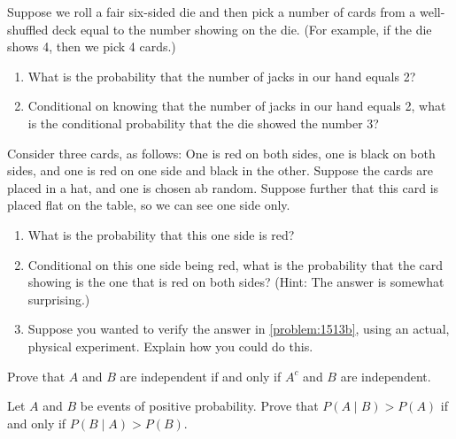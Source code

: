 \begin{exercises}
    \item Suppose we roll a fair six-sided die and then pick a number of cards from a well-shuffled deck equal to the number showing on the die. (For example, if the die shows 4, then we pick 4 cards.)
        \begin{enumerate}
            \item What is the probability that the number of jacks in our hand equals 2?
            \item Conditional on knowing that the number of jacks in our hand equals 2, what is the conditional probability that the die showed the number 3?
        \end{enumerate}
\end{exercises}

\begin{problems}
    \item Consider three cards, as follows: One is red on both sides, one is black on both sides, and one is red on one side and black in the other. Suppose the cards are placed in a hat, and one is chosen ab random. Suppose further that this card is placed flat on the table, so we can see one side only.
        \begin{enumerate}
            \item What is the probability that this one side is red?
            \item \label{problem:1513b}Conditional on this one side being red, what is the probability that the card showing is the one that is red on both sides? (Hint: The answer is somewhat surprising.)
            \item Suppose you wanted to verify the answer in  \autoref{problem:1513b}, using an actual, physical experiment. Explain how you could do this.
        \end{enumerate}
    \item Prove that $A$ and $B$ are independent if and only if $A^c$ and $B$ are independent.
    \item Let $A$ and $B$ be events of positive probability. Prove that $P(A\mid B) > P(A)$ if and only if $P(B\mid A)>P(B)$.
\end{problems}


